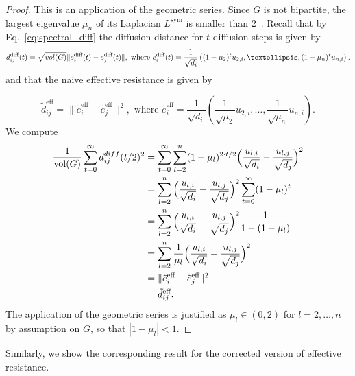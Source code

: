 \documentclass{article}
\theoremstyle{plain}
\theoremstyle{definition}
\theoremstyle{remark}
\begin{document}
\begin{proof}
    This is an application of the geometric series. Since $G$ is not bipartite, the largest eigenvalue $\mu_n$ of its Laplacian $L^{\text{sym}}$ is smaller than $2$~\citep[ Lemma 1.7]{chung1997spectral}. Recall that by Eq.~\eqref{eq:spectral_diff} the diffusion distance for $t$ diffusion steps is given by 
    \begin{align}
    d_{ij}^{\text{diff}}(t) = \sqrt{\textnormal{vol}(G)}\| e_i^{\text{diff}}(t) - e_j^{\text{diff}}(t)\|, \text{ where } e_i^{\text{diff}}(t) = \frac{1}{\sqrt{d_i}} \left((1-\mu_2)^t u_{2,i}, \ldots, (1-\mu_n)^t u_{n,i}\right).
\end{align}
and that the naive effective resistance is given by

\begin{equation}
    \tilde{d}^{\text{eff}}_{ij} = \| \tilde{e}_i^{\text{eff}} - \tilde{e}_j^{\text{eff}}\|^2, \text{ where } \tilde{e}_i^{\text{eff}} = \frac{1}{\sqrt{d_i}}\left(\frac{1}{\sqrt{\mu_2}} u_{2,i},\ldots,\frac{1}{\sqrt{\mu_n}} u_{n,i}\right).
\end{equation}
    We compute
    \begin{align}
        \frac{1}{\text{vol}(G)}\sum_{t=0}^\infty d^{\textnormal{diff}}_{ij}(t/2)^2 
        &=\sum_{t=0}^\infty \sum_{l=2}^n (1-\mu_l)^{2\cdot t/2} \Big(\frac{u_{l, i}}{\sqrt{d_i}} - \frac{u_{l, j}}{\sqrt{d_j}}\Big)^2 \\
        &= \sum_{l=2}^n \Big(\frac{u_{l, i}}{\sqrt{d_i}} - \frac{u_{l, j}}{\sqrt{d_j}}\Big)^2 \sum_{t=0}^\infty (1-\mu_l)^{t} \\
        &= \sum_{l=2}^n \Big(\frac{u_{l, i}}{\sqrt{d_i}} - \frac{u_{l, j}}{\sqrt{d_j}}\Big)^2 \frac{1}{1- (1-\mu_l)} \\
        &= \sum_{l=2}^n \frac{1}{\mu_l}\Big(\frac{u_{l, i}}{\sqrt{d_i}} - \frac{u_{l, j}}{\sqrt{d_j}}\Big)^2 \\
        &= \| \tilde{e}^\text{eff}_i - \tilde{e}^\text{eff}_j \| ^2 \\
        &= \tilde{d}^{\text{eff}}_{ij}.
    \end{align}
    The application of the geometric series is justified as $\mu_l \in (0, 2)$ for $l=2, \dots, n$ by assumption on $G$, so that \mbox{$|1-\mu_l| < 1$.}
\end{proof}

Similarly, we show the corresponding result for the corrected version of effective resistance.
\end{document}
